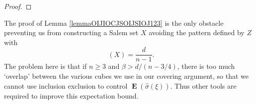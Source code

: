 \documentclass[12pt,reqno]{article}
\numberwithin{equation}{section}
\DeclareMathOperator{\fordim}{\dim_{\mathbf{F}}}
\DeclareMathOperator{\ZZ}{\mathbf{Z}}
\newtheorem{lemma}[theorem]{Lemma}
\numberwithin{theorem}{section}
\DeclareMathOperator{\EE}{\mathbf{E}}
\begin{document}
\begin{proof}
\end{proof}

The proof of Lemma \ref{lemmaOIJIOCJSOIJSIOJ123} is the only obstacle preventing us from constructing a Salem set $X$ avoiding the pattern defined by $Z$ with
%
\[ \fordim(X) = \frac{d}{n-1}. \]
%
The problem here is that if $n \geq 3$ and $\beta > d/(n-3/4)$, there is too much `overlap' between the various cubes we use in our covering argument, so that we cannot use inclusion exclusion to control $\EE(\widehat{\sigma}(\xi))$. Thus other tools are required to improve this expectation bound.




\begin{comment}

\begin{lemma} \label{equationDIOJDOIJCIJ}
    Let $S$ be the set of indices $k_1 \in \{ 1, \dots, K \}$ such that there are indices $k_2,\dots,k_n \in \{ 1,\dots,K \}$ with the property that
    \[ |X_1(k_1) - f(X_2(k_2),\dots,X_n(k_n))| \leq (L+1)r. \]
    Then if $k_1 \not \in S$ and $k_2,\dots,k_n \in \{ 1,\dots,K \}$, if $X = (X_{k_1}^1,\dots,X_{k_n}^n)$, then $d(X,W) \geq r$.
\end{lemma}
\begin{proof}
    It follows by definition that
    \[ |X_1(k_1) - f(X_2(k_2),\dots,X_n(k_n))| \geq (L+1)r. \]
    If $Y = (Y_1,\dots,Y_n) \in W \cap (Q_1 \times \dots \times Q_n)$, then
    \begin{align*}
        (L+1)r &\leq |X_1(k_1) - f(X_2(k_2),\dots,X_n(k_n))|\\
        &\leq |X_1(k_1) - Y_1| + |Y_1 - f(X_2(k_2),\dots,X_n(k_n)|\\
        &= |X_1(k_1) - Y_1| + |f(Y_2,\dots,Y_n) - f(X_2(k_2),\dots,X_n(k_n)|\\
        &\leq |X_1(k_1) - Y_1| + L|(Y_2,\dots,Y_n) - (X_2(k_2),\dots,X_n(k_n))\\
        &\leq (L+1) |X - Y|,
    \end{align*}
    so $|X-Y| \geq r$.
\end{proof}

\end{comment}
\end{document}
